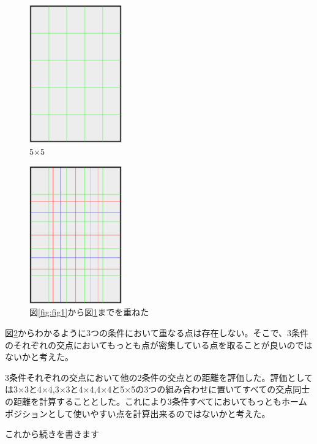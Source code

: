 \documentclass[11pt,a4paper]{jarticle}
\begin{document}
\begin{figure}[H]
  \begin{center}
  \includegraphics[width=4cm]{fig/photo3.eps}
  \caption{5×5}
  \label{fig:fig3}
  \end{center}
\end{figure}

\begin{figure}[H]
  \begin{center}
  \includegraphics[width=4cm]{fig/photo4.eps}
  \caption{図\ref{fig:fig1}から図\ref{fig:fig3}までを重ねた}
  \label{fig:fig4}
  \end{center}
\end{figure}


図\ref{fig:fig4}からわかるように3つの条件において重なる点は存在しない。そこで、3条件のそれぞれの交点においてもっとも点が密集している点を取ることが良いのではないかと考えた。


3条件それぞれの交点において他の2条件の交点との距離を評価した。評価としては3×3と4×4,3×3と4×4,4×4と5×5の3つの組み合わせに置いてすべての交点同士の距離を計算することとした。これにより3条件すべてにおいてもっともホームポジションとして使いやすい点を計算出来るのではないかと考えた。

これから続きを書きます
\end{document}
